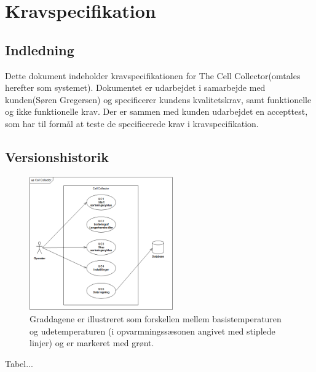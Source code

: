 \chapter{Kravspecifikation}

\section{Indledning}
Dette dokument indeholder kravspecifikationen for The Cell Collector(omtales herefter som systemet). Dokumentet er udarbejdet i samarbejde med kunden(Søren Gregersen) og specificerer kundens kvalitetskrav, samt funktionelle og ikke funktionelle krav. Der er sammen med kunden udarbejdet en accepttest, som har til formål at teste de specificerede krav i kravspecifikation.
\section{Versionshistorik}

\begin{figure}[H]
	\centering
	\includegraphics[width=0.55\textwidth]{billeder/UC_CellCollector.png}
	\caption{Graddagene er illustreret som forskellen mellem basistemperaturen og udetemperaturen (i opvarmningssæsonen angivet med stiplede linjer) og er markeret med grønt.}
	\label{fig:gdmetode}
\end{figure}

Tabel...

